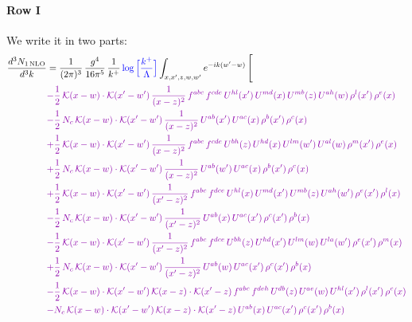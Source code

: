 \documentclass[10pt]{article}
\numberwithin{equation}{section}
\newcommand{\new}[1]{{\color{blue}#1}}
\begin{document}
\paragraph{Row I}
We write it in two parts: 
\begin{align}
\frac{d^{3}N_{1\,\mathrm{NLO}}}{d^{3}k} & = \frac{1}{(2\pi)^{3}}\,\frac{g^{4}}{16\pi^{5}}\,\frac{1}{k^{+}}\,\new{\log\Big[\frac{k^{+}}{\Lambda}\Big]}\int_{x,x',z,w,w'}e^{-ik(w'-w)}\,\Bigg[\notag\\ &{\color{CC} -\frac{1}{2}\,\mathcal{K}(x-w)\cdot\mathcal{K}(x'-w')\,\frac{1}{(x-z)^{2}}\,f^{abc}\,f^{cde}\,U^{hl}(x')\,U^{md}(x)\,U^{mb}(z)\,U^{ah}(w)\,\rho^{l}(x')\,\rho^{e}(x)} \notag\\
&{\color{CC} -\frac{1}{2}\,N_{c}\,\mathcal{K}(x-w)\cdot\mathcal{K}(x'-w')\,\frac{1}{(x-z)^{2}}\,U^{ab}(x')\,U^{ac}(x)\,\rho^{b}(x')\,\rho^{c}(x)} \notag\\
&{\color{CC} +\frac{1}{2}\,\mathcal{K}(x-w)\cdot\mathcal{K}(x'-w')\,\frac{1}{(x-z)^{2}}\,f^{abc}\,f^{cde}\,U^{bh}(z)\,U^{hd}(x)\,U^{lm}(w')\,U^{al}(w)\,\rho^{m}(x')\,\rho^{e}(x)} \notag\\
&{\color{CC} +\frac{1}{2}\,N_{c}\,\mathcal{K}(x-w)\cdot\mathcal{K}(x'-w')\,\frac{1}{(x-z)^{2}}\,U^{ab}(w')\,U^{ac}(x)\,\rho^{b}(x')\,\rho^{c}(x)} \notag\\
&{\color{CC} +\frac{1}{2}\,\mathcal{K}(x-w)\cdot\mathcal{K}(x'-w')\,\frac{1}{(x'-z)^{2}}\,f^{abc}\,f^{dce}\,U^{hl}(x)\,U^{md}(x')\,U^{mb}(z)\,U^{ah}(w')\,\rho^{e}(x')\,\rho^{l}(x)} \notag\\
&{\color{CC} -\frac{1}{2}\,N_{c}\,\mathcal{K}(x-w)\cdot\mathcal{K}(x'-w')\,\frac{1}{(x'-z)^{2}}\,U^{ab}(x)\,U^{ac}(x')\,\rho^{c}(x')\,\rho^{b}(x)} \notag\\
&{\color{CC} -\frac{1}{2}\,\mathcal{K}(x-w)\cdot\mathcal{K}(x'-w')\,\frac{1}{(x'-z)^{2}}\,f^{abc}\,f^{dce}\,U^{bh}(z)\,U^{hd}(x')\,U^{lm}(w)\,U^{la}(w')\,\rho^{e}(x')\,\rho^{m}(x)} \notag\\
&{\color{CC} +\frac{1}{2}\,N_{c}\,\mathcal{K}(x-w)\cdot\mathcal{K}(x'-w')\,\frac{1}{(x'-z)^{2}}\,U^{ab}(w)\,U^{ac}(x')\,\rho^{c}(x')\,\rho^{b}(x)} \notag\\
&{\color{CC} -\frac{1}{2}\,\mathcal{K}(x-w)\cdot\mathcal{K}(x'-w')\,\mathcal{K}(x-z)\cdot\mathcal{K}(x'-z)\,f^{abc}\,f^{deh}\,U^{db}(z)\,U^{ae}(w)\,U^{hl}(x')\,\rho^{l}(x')\,\rho^{c}(x)} \notag\\
&{\color{CC} -N_{c}\,\mathcal{K}(x-w)\cdot\mathcal{K}(x'-w')\,\mathcal{K}(x-z)\cdot\mathcal{K}(x'-z)\,U^{ab}(x)\,U^{ac}(x')\,\rho^{c}(x')\,\rho^{b}(x)} \notag\\

\end{align}
\end{document}
